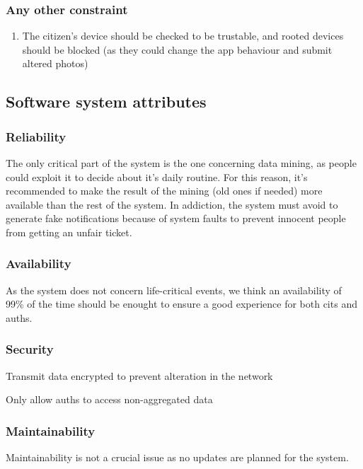 \documentclass{article}
\newcommand{\enum}[1]{\texttt{#1.\arabic*}}
\begin{document}
		\subsubsection{Any other constraint} 
			\begin{enumerate}[label=\enum{OT}]
				\item The citizen's device should be checked to be trustable, and rooted devices should be blocked (as they could change the app behaviour and submit altered photos)
			\end{enumerate}		
		
	\subsection{Software system attributes}
	
		\subsubsection{Reliability}
			The only critical part of the system is the one concerning data mining, as people could exploit it to decide about it's daily routine. For this reason, it's recommended to make the result of the mining (old ones if needed) more available than the rest of the system.
			In addiction, the system must avoid to generate fake notifications because of system faults to prevent innocent people from getting an unfair ticket.
			
		\subsubsection{Availability}
			As the system does not concern life-critical events, we think an availability of 99\% of the time should be enought to ensure a good experience for both cits and auths.
			
		\subsubsection{Security}
			\begin{list}{-}{}
				\item Transmit data encrypted to prevent alteration in the network
				\item Only allow auths to access non-aggregated data
			\end{list}
			
		\subsubsection{Maintainability}
			Maintainability is not a crucial issue as no updates are planned for the system.
			
\end{document}
